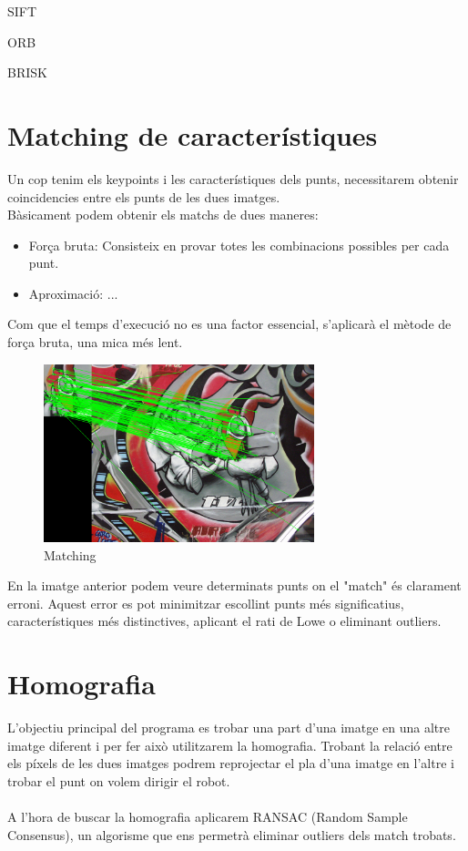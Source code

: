 	SIFT

	ORB

	BRISK

\newpage
\section{Matching de característiques}

	Un cop tenim els keypoints i les característiques dels punts, necessitarem obtenir coincidencies entre els punts de les dues imatges.\\
	Bàsicament podem obtenir els matchs de dues maneres:\\
	\begin{itemize}	
		\item{Força bruta: Consisteix en provar totes les combinacions possibles per cada punt.}
		\item{Aproximació: ...}
	\end{itemize}
	Com que el temps d'execució no es una factor essencial, s'aplicarà el mètode de força bruta, una mica més lent.

	\begin{figure}[H]
		\centering
		\includegraphics[width=0.7\textwidth]{images/matching}
		\caption{Matching}
	\end{figure}

	En la imatge anterior podem veure determinats punts on el "match" és clarament erroni. Aquest error es pot minimitzar escollint punts més significatius, característiques més distinctives, aplicant el rati
	de Lowe o eliminant outliers.

\newpage
\section{Homografia}

	L'objectiu principal del programa es trobar una part d'una imatge en una altre imatge diferent i per fer això utilitzarem la homografia. Trobant la relació entre els píxels de les dues imatges podrem
	reprojectar el pla d'una imatge en l'altre i trobar el punt on volem dirigir el robot.\\\\
	A l'hora de buscar la homografia aplicarem RANSAC (Random Sample Consensus), un algorisme que ens permetrà eliminar outliers dels match trobats.\\

